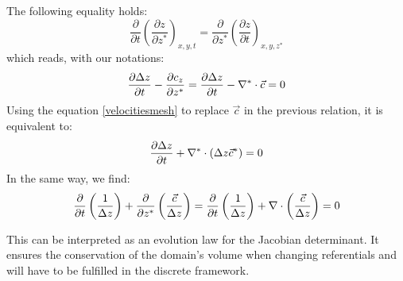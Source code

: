 The following equality holds:
\begin{equation}
\dfrac{\partial}{\partial t}\left(  \dfrac{\partial z}{\partial z^{\ast}%
}\right)_{x,y,t} = \dfrac{\partial}{\partial z^{\ast}}\left(  \dfrac{\partial
z}{\partial t}\right)_{x,y,z^*}
\end{equation}
which reads, with our notations:
\begin{equation}
\dfrac{\partial \Delta z}{\partial t} - \dfrac{\partial c_z}{\partial z^{\ast}}
= \dfrac{\partial \Delta z}{\partial t} - \nabla^* \cdot \vec{c} = 0
\end{equation}
Using the equation \eqref{velocitiesmesh} to replace $\vec{c}$ in the previous relation, it is equivalent to:
\begin{equation}
\dfrac{\partial \Delta z}{\partial t}+\nabla^* \cdot(\Delta z\vec{c}^*)=0
\end{equation}
In the same way, we find:
\begin{equation}
\dfrac{\partial}{\partial t}\left(\dfrac{1}{\Delta z}\right)+\dfrac{\partial}{\partial
z^{\ast}}\left(\dfrac{\vec{c}}{\Delta z}\right)=\dfrac{\partial}{\partial t}\left(\dfrac{1}{\Delta z}\right)+\nabla \cdot\left(\dfrac{\vec{c}}{\Delta z}\right)=0
\end{equation}

This can be interpreted as an evolution law for the Jacobian determinant.
It ensures the conservation of the domain's volume when changing referentials and will have
to be fulfilled in the discrete framework.

